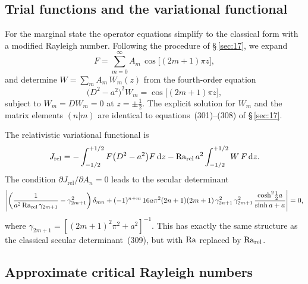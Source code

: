 \subsection{Trial functions and the variational functional}

For the marginal state the operator equations simplify to the classical
form with a modified Rayleigh number.  Following the procedure of
\S\,\ref{sec:17}, we expand
\begin{equation}\label{eq:rel-2-280}
  F = \sum_{m=0}^{\infty} A_{m}\,\cos\bigl[(2m+1)\pi z\bigr],
\end{equation}
and determine $W = \sum_{m} A_{m}\,W_{m}(z)$ from the fourth-order
equation
\begin{equation}\label{eq:rel-2-283}
  \bigl(D^{2} - a^{2}\bigr)^{2} W_{m}
  = \cos\bigl[(2m+1)\pi z\bigr],
\end{equation}
subject to $W_{m} = DW_{m} = 0$ at $z = \pm\tfrac{1}{2}$.  The
explicit solution for $W_{m}$ and the matrix elements $(n|m)$ are
identical to equations~(301)--(308) of \S\,\ref{sec:17}.

The relativistic variational functional is
\begin{equation}\label{eq:rel-2-288}
  J_{\mathrm{rel}}
  = -\int_{-1/2}^{+1/2} F\bigl(D^{2}-a^{2}\bigr)F\,\mathrm{d}z
  - \mathrm{Ra}_{\mathrm{rel}}\,a^{2}\int_{-1/2}^{+1/2} W\,F\,\mathrm{d}z.
\end{equation}
The condition $\partial J_{\mathrm{rel}}/\partial A_{n} = 0$ leads to
the secular determinant
\begin{equation}\label{eq:rel-2-309}
  \left|
    \left(
      \frac{1}{a^{2}\,\mathrm{Ra}_{\mathrm{rel}}\,\gamma_{2m+1}}
      - \gamma_{2m+1}^{2}
    \right)\delta_{mn}
    + (-1)^{n+m}\,16a\pi^{2}(2n+1)(2m+1)\,
      \gamma_{2n+1}^{2}\,\gamma_{2m+1}^{2}\,
      \frac{\cosh^{2}\!\tfrac{1}{2}a}{\sinh a + a}
  \right| = 0,
\end{equation}
where $\gamma_{2m+1} = [(2m+1)^{2}\pi^{2}+a^{2}]^{-1}$.  This has
exactly the same structure as the classical secular
determinant~(309), but with $\mathrm{Ra}$ replaced by $\mathrm{Ra}_{\mathrm{rel}}$.

\subsection{Approximate critical Rayleigh numbers}

